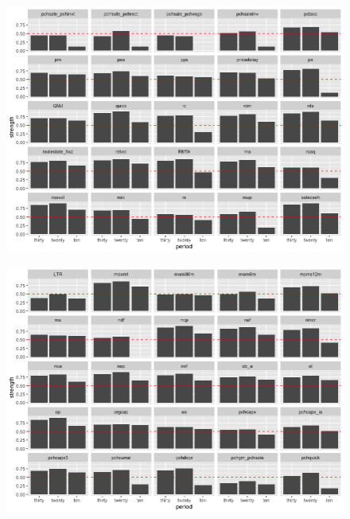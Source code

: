 \begin{landscape}
	\begin{figure}[ht]
		\includegraphics[scale = 0.7]{strength_comparison_V}
		\centering
	\end{figure}
\end{landscape}

\begin{landscape}
	\begin{figure}[ht]
		\includegraphics[scale = 0.7]{strength_comparison_IV}
		\centering
	\end{figure}
\end{landscape}

